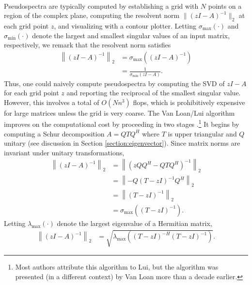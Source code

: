 \documentclass{article}
\begin{document}
\paragraph{} Pseudospectra are typically computed by establishing a
grid with \(N\) points on a region of the complex plane, computing the
resolvent norm \(\lVert (zI - A)^{-1} \rVert_2\) at each grid point
\(z\), and visualizing with a contour plotter. Letting
\(\sigma_\text{max}(\cdot)\) and \(\sigma_\text{min}(\cdot)\) denote
the largest and smallest singular values of an input matrix,
respectively, we remark that the resolvent norm satisfies
\begin{align}
  \left\lVert \left(zI - A\right)^{-1} \right\rVert_2
  &= \sigma_\text{max}\left( \left(zI - A\right)^{-1} \right) \nonumber \\
  &= \frac{1}{\sigma_\text{min}\left( zI - A \right)}.
\end{align}
Thus, one could naively compute pseudospectra by computing the SVD of
\(zI-A\)
for each grid point \(z\)
and reporting the reciprocal of the smallest singular value. However,
this involves a total of \(O(Nn^3)\)
flops, which is prohibitively expensive for large matrices unless the
grid is very coarse. The Van Loan/Lui algorithm improves on the
computational cost by proceeding in two stages \cite{van1984near,
  lui1997computation}.\footnote{Most authors attribute this algorithm
  to Lui, but the algorithm was presented (in a different context) by
  Van Loan more than a decade earlier.} It begins by computing a Schur
decomposition \(A=QTQ^H\)
where \(T\)
is upper triangular and \(Q\)
unitary (see discussion in Section \ref{section:eigenvector}). Since
matrix norms are invariant under unitary transformations,
\begin{align*}
  \left\lVert \left( zI-A \right)^{-1} \right\rVert_2
  &= \left\lVert \left( zQQ^H - QTQ^H \right)^{-1} \right\rVert_2 \\
  &= \left\lVert -Q\left( T -zI\right)^{-1} Q^H \right\rVert_2 \\
  &= \left\lVert \left( T-zI \right)^{-1}\right\rVert_2 \\
  &= \sigma_\text{max}\left( \left( T-zI \right)^{-1} \right).
\end{align*}
Letting \(\lambda_\text{max}(\cdot)\) denote the largest eigenvalue of
a Hermitian matrix,
\begin{align}
  \left\lVert \left( zI-A \right)^{-1} \right\rVert_2
  &= \sqrt{\lambda_\text{max}\left( \left( T-zI \right)^{-H} \left( T-zI \right)^{-1} \right)}.
\end{align}
\end{document}

